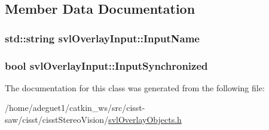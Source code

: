 \subsection{Member Data Documentation}
\hypertarget{classsvl_overlay_input_a193d910ca5ced17419e6c0bd51169265}{
\subsubsection[{Input\-Name}]{\setlength{\rightskip}{0pt plus 5cm}std\-::string svl\-Overlay\-Input\-::\-Input\-Name\hspace{0.3cm}{\ttfamily [protected]}}}\label{classsvl_overlay_input_a193d910ca5ced17419e6c0bd51169265}
\hypertarget{classsvl_overlay_input_a16cf008dbd4809ec1ccf0e9b28ac6d3a}{
\subsubsection[{Input\-Synchronized}]{\setlength{\rightskip}{0pt plus 5cm}bool svl\-Overlay\-Input\-::\-Input\-Synchronized\hspace{0.3cm}{\ttfamily [protected]}}}\label{classsvl_overlay_input_a16cf008dbd4809ec1ccf0e9b28ac6d3a}


The documentation for this class was generated from the following file\-:\begin{DoxyCompactItemize}
\item 
/home/adeguet1/catkin\-\_\-ws/src/cisst-\/saw/cisst/cisst\-Stereo\-Vision/\hyperlink{svl_overlay_objects_8h}{svl\-Overlay\-Objects.\-h}\end{DoxyCompactItemize}
